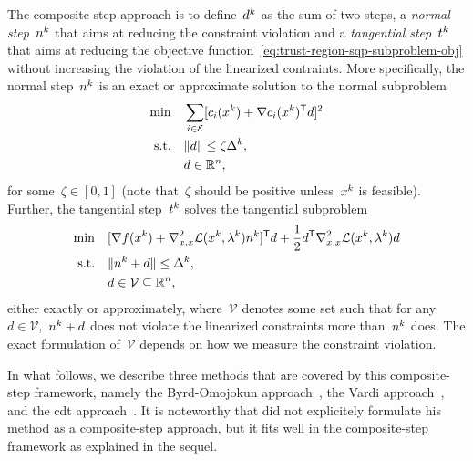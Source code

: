 The composite-step approach is to define~$\step[k]$ as the sum of two steps, a \emph{normal step}~$\nstep[k]$ that aims at reducing the constraint violation and a \emph{tangential step}~$\tstep[k]$ that aims at reducing the objective function~\cref{eq:trust-region-sqp-subproblem-obj} without increasing the violation of the linearized contraints.
More specifically, the normal step~$\nstep[k]$ is an exact or approximate solution to the normal subproblem
\begin{subequations}
    \label{eq:byrd-omojokun-original}
    \begin{align}
        \min        & \quad \sum_{i \in \ieq} [\con{i}(\iter[k]) + \nabla \con{i}(\iter[k])^{\T} \step]^2 \label{eq:byrd-omojokun-original-obj}\\
        \text{s.t.} & \quad \norm{\step} \le \zeta \rad[k],\\
                    & \quad \step \in \R^n, \nonumber
    \end{align}
\end{subequations}
for some~$\zeta \in [0, 1]$ (note that~$\zeta$ should be positive unless~$\iter[k]$ is feasible).
Further, the tangential step~$\tstep[k]$ solves the tangential subproblem
\begin{subequations}
    \label{eq:tangential-step-original}
    \begin{align}
        \min        & \quad [\nabla \obj(\iter[k]) + \nabla_{x, x}^2 \lag(\iter[k], \lm[k]) \nstep[k]]^{\T} \step + \frac{1}{2} \step^{\T} \nabla_{x, x}^2 \lag(\iter[k], \lm[k]) \step\\
        \text{s.t.} & \quad \norm{\nstep[k] + \step} \le \rad[k],\\
                    & \quad \step \in \mathcal{V} \subseteq \R^n,
    \end{align}
\end{subequations}
either exactly or approximately, where~$\mathcal{V}$ denotes some set such that for any~$d \in \mathcal{V}$,~$\nstep[k] + \step$ does not violate the linearized constraints more than~$\nstep[k]$ does.
The exact formulation of~$\mathcal{V}$ depends on how we measure the constraint violation.

In what follows, we describe three methods that are covered by this composite-step framework, namely the Byrd-Omojokun approach~\cite{Byrd_1987,Omojokun_1989}, the Vardi approach~\cite{Vardi_1985}, and the \gls{cdt} approach~\cite{Celis_Dennis_Tapia_1985}.
It is noteworthy that \citeauthor{Vardi_1985} did not explicitely formulate his method as a composite-step approach, but it fits well in the composite-step framework as explained in the sequel.

